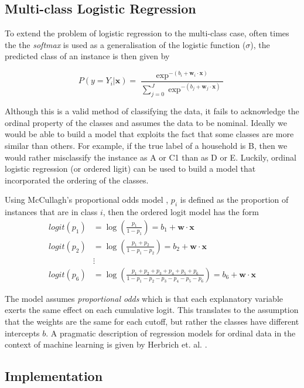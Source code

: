 \subsection{Multi-class Logistic Regression}

To extend the problem of logistic regression to the multi-class case, often times the the \textit{softmax} is used as a generalisation of the logistic function ($\sigma$), the predicted class of an instance is then given by

\[P(y=Y_i|\textbf{x})=\frac{\exp^{-(b_i+\textbf{w}_i\cdot{\textbf{x}})}}{\sum_{j=0}^J\exp^{-(b_j+\textbf{w}_j\cdot{\textbf{x}})}}\]

Although this is a valid method of classifying the data, it fails to acknowledge the ordinal property of the classes and assumes the data to be nominal. Ideally we would be able to build a model that exploits the fact that some classes are more similar than others. For example, if the true label of a household is B, then we would rather misclassify the instance as A or C1 than as D or E. Luckily, ordinal logistic regression (or ordered ligit) can be used to build a model that incorporated the ordering of the classes.

Using McCullagh's proportional odds model \cite{McCullagh}, $p_i$ is defined as the proportion of instances that are in class $i$, then the ordered logit model has the form
\begin{align*}
logit(p_1) &=\log(\frac{p_1}{1-p_1}) = b_1 +\textbf{w}\cdot{\textbf{x}} \\
logit(p_2) &=\log(\frac{p_1+p_2}{1-p_1-p_2}) = b_2 +\textbf{w}\cdot{\textbf{x}}\\
&\vdots \\
logit(p_6) &=\log(\frac{p_1+p_2+p_3+p_4+p_5+p_6}{1-p_1-p_2-p_3-p_4-p_5-p_6}) = b_6 +\textbf{w}\cdot{\textbf{x}}
\end{align*}

The model assumes \textit{proportional odds} which is that each explanatory variable exerts the same effect on each cumulative logit. This translates to the assumption that the weights are the same for each cutoff, but rather the classes have different intercepts $b$. A pragmatic description of regression models for ordinal data in the context of machine learning is given by Herbrich et. al. \cite{Herbrich}.
\subsection{Implementation}

